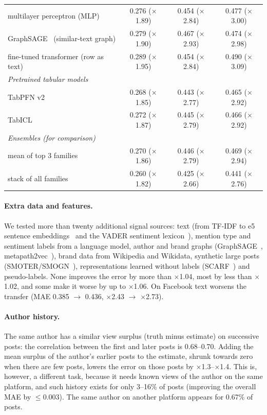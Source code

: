 \documentclass[10pt,a4paper]{article}
\newcommand{\x}[1]{$\times$#1}
\begin{document}
\begin{table}[!htb]
\begin{tabular}{lccc}
\quad multilayer perceptron (MLP) & 0.276 (\x{1.89}) & 0.454 (\x{2.84}) & 0.477 (\x{3.00}) \\
\quad GraphSAGE~\cite{graphsage} (similar-text graph) & 0.279 (\x{1.90}) & 0.467 (\x{2.93}) & 0.474 (\x{2.98}) \\
\quad fine-tuned transformer (row as text) & 0.289 (\x{1.95}) & 0.454 (\x{2.84}) & 0.490 (\x{3.09}) \\
\multicolumn{4}{l}{\textit{Pretrained tabular models}} \\
\quad TabPFN v2 & 0.268 (\x{1.85}) & 0.443 (\x{2.77}) & 0.465 (\x{2.92}) \\
\quad TabICL~\cite{tabicl} & 0.272 (\x{1.87}) & 0.445 (\x{2.79}) & 0.466 (\x{2.92}) \\
\midrule
\multicolumn{4}{l}{\textit{Ensembles (for comparison)}} \\
\quad mean of top 3 families & 0.270 (\x{1.86}) & 0.446 (\x{2.79}) & 0.469 (\x{2.94}) \\
\quad stack of all families & 0.260 (\x{1.82}) & 0.425 (\x{2.66}) & 0.441 (\x{2.76}) \\
\bottomrule
\end{tabular}
\end{table}

\paragraph{Extra data and features.} We tested more than twenty additional signal sources: text (from TF-IDF to e5
sentence embeddings~\cite{e5} and the VADER sentiment lexicon~\cite{vader}), mention type and sentiment labels from a
language model, author and brand graphs (GraphSAGE~\cite{graphsage}, metapath2vec~\cite{metapath2vec}), brand data from
Wikipedia and Wikidata, synthetic large posts (SMOTER/SMOGN~\cite{smogn}), representations learned without labels
(SCARF~\cite{scarf}) and pseudo-labels. None improves the error by more than \x{1.04}, most by less than \x{1.02}, and
some make it worse by up to \x{1.06}. On Facebook text worsens the transfer (MAE 0.385 $\to$ 0.436, \x{2.43} $\to$ \x{2.73}).

\paragraph{Author history.} The same author has a similar view surplus (truth minus estimate) on successive posts: the
correlation between the first and later posts is 0.68--0.70. Adding the mean surplus of the author's earlier posts to
the estimate, shrunk towards zero when there are few posts, lowers the error on those posts by \x{1.3}--\x{1.4}. This
is, however, a different task, because it needs known views of the author on the same platform, and such history exists
for only 3--16\% of posts (improving the overall MAE by $\le$0.003). The same author on another platform appears for 0.67\% of
posts.
\end{document}
